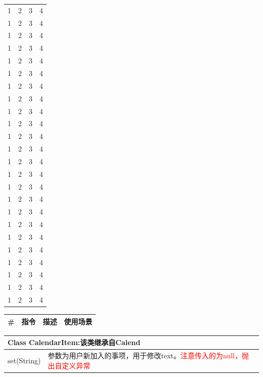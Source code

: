 \documentclass[UTF8,a4paper,12pt]{ctexart}%
\begin{document}
\begin{center}
\begin{longtable}{|c|c|c|c|}
		1 & 2 & 3 & 4 \\ 1 & 2 & 3 & 4 \\ 1 & 2 & 3 & 4 \\ 1 & 2 & 3 & 4 \\
		1 & 2 & 3 & 4 \\ 1 & 2 & 3 & 4 \\ 1 & 2 & 3 & 4 \\ 1 & 2 & 3 & 4 \\
		1 & 2 & 3 & 4 \\ 1 & 2 & 3 & 4 \\ 1 & 2 & 3 & 4 \\ 1 & 2 & 3 & 4 \\
		1 & 2 & 3 & 4 \\ 1 & 2 & 3 & 4 \\ 1 & 2 & 3 & 4 \\ 1 & 2 & 3 & 4 \\
		1 & 2 & 3 & 4 \\ 1 & 2 & 3 & 4 \\ 1 & 2 & 3 & 4 \\ 1 & 2 & 3 & 4 \\
		1 & 2 & 3 & 4 \\ 1 & 2 & 3 & 4 \\ 1 & 2 & 3 & 4 \\ 1 & 2 & 3 & 4 \\
	\end{longtable}
\end{center}

\begin{center}
	\begin{longtable}{|p{1cm}|p{2cm}|p{3cm}|p{4cm}|}
		\hline
		\#&指令&描述&使用场景\\ \hline \hline
		\endhead
	\end{longtable}
\end{center}

\begin{center}
	\begin{tabular}{|p{5cm}|p{6cm}|}
		\hline
		\multicolumn{2}{|p{11cm}|}{\textbf{Class  CalendarItem:}该类继承自Calend}\\ \hline
		set(String)& 参数为用户新加入的事项，用于修改text。\textcolor{red}{注意传入的为null，抛出自定义异常}\\ \hline
	\end{tabular}
\end{center}

\newpage
{}
\end{document}
